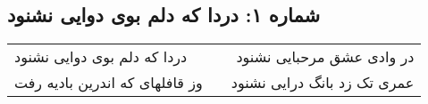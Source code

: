 \begin{center}
\section*{شماره ۱: دردا که دلم بوی دوایی نشنود}
\label{sec:001}
\begin{longtable}{l p{0.5cm} r}
دردا که دلم بوی دوایی نشنود
&&
در وادی عشق مرحبایی نشنود
\\
وز قافلهای که اندرین بادیه رفت
&&
عمری تک زد بانگ درایی نشنود
\\
\end{longtable}
\end{center}

